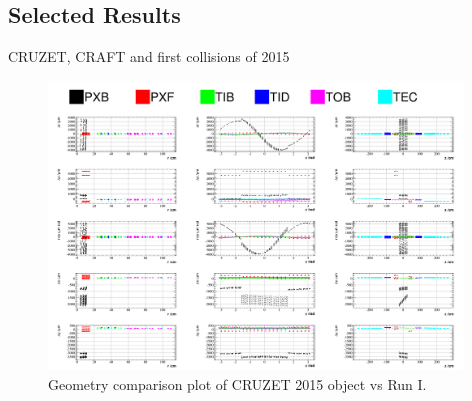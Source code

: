 \subsection{Selected Results}
\label{sec:alignmentResults}
CRUZET, CRAFT and first collisions of 2015

\begin{figure}[htb]
    \begin{center}
        \includegraphics[width=0.98\textwidth]{../figs/Alignment/global_tracker_2_final.png}
    \end{center}
    \caption{Geometry comparison plot of CRUZET 2015 object vs Run I.}
    \label{fig:trackAndResiduals}
\end{figure}



